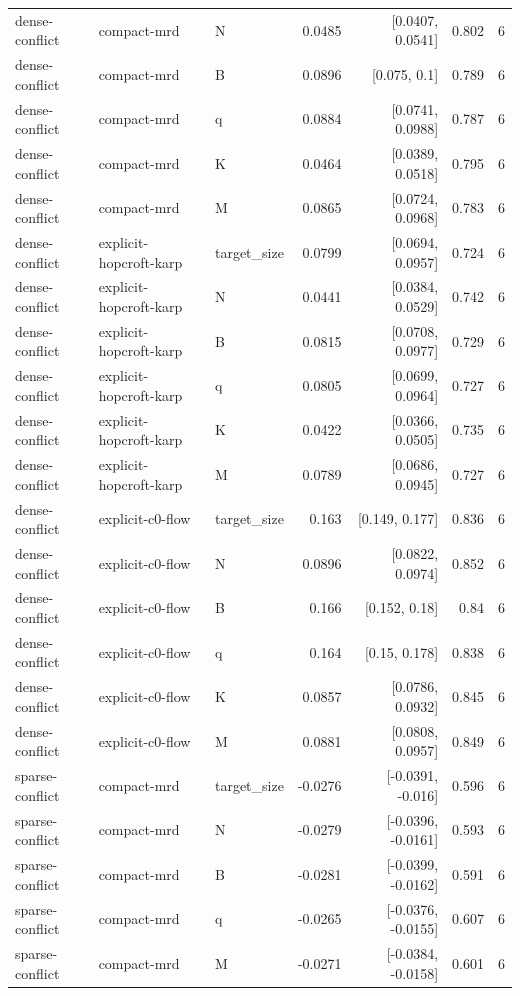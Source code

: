 \begin{table}[t]
\begin{tabular}{lllrrrr}
dense-conflict & compact-mrd & N & 0.0485 & [0.0407, 0.0541] & 0.802 & 6 \\
dense-conflict & compact-mrd & B & 0.0896 & [0.075, 0.1] & 0.789 & 6 \\
dense-conflict & compact-mrd & q & 0.0884 & [0.0741, 0.0988] & 0.787 & 6 \\
dense-conflict & compact-mrd & K & 0.0464 & [0.0389, 0.0518] & 0.795 & 6 \\
dense-conflict & compact-mrd & M & 0.0865 & [0.0724, 0.0968] & 0.783 & 6 \\
dense-conflict & explicit-hopcroft-karp & target_size & 0.0799 & [0.0694, 0.0957] & 0.724 & 6 \\
dense-conflict & explicit-hopcroft-karp & N & 0.0441 & [0.0384, 0.0529] & 0.742 & 6 \\
dense-conflict & explicit-hopcroft-karp & B & 0.0815 & [0.0708, 0.0977] & 0.729 & 6 \\
dense-conflict & explicit-hopcroft-karp & q & 0.0805 & [0.0699, 0.0964] & 0.727 & 6 \\
dense-conflict & explicit-hopcroft-karp & K & 0.0422 & [0.0366, 0.0505] & 0.735 & 6 \\
dense-conflict & explicit-hopcroft-karp & M & 0.0789 & [0.0686, 0.0945] & 0.727 & 6 \\
dense-conflict & explicit-c0-flow & target_size & 0.163 & [0.149, 0.177] & 0.836 & 6 \\
dense-conflict & explicit-c0-flow & N & 0.0896 & [0.0822, 0.0974] & 0.852 & 6 \\
dense-conflict & explicit-c0-flow & B & 0.166 & [0.152, 0.18] & 0.84 & 6 \\
dense-conflict & explicit-c0-flow & q & 0.164 & [0.15, 0.178] & 0.838 & 6 \\
dense-conflict & explicit-c0-flow & K & 0.0857 & [0.0786, 0.0932] & 0.845 & 6 \\
dense-conflict & explicit-c0-flow & M & 0.0881 & [0.0808, 0.0957] & 0.849 & 6 \\
sparse-conflict & compact-mrd & target_size & -0.0276 & [-0.0391, -0.016] & 0.596 & 6 \\
sparse-conflict & compact-mrd & N & -0.0279 & [-0.0396, -0.0161] & 0.593 & 6 \\
sparse-conflict & compact-mrd & B & -0.0281 & [-0.0399, -0.0162] & 0.591 & 6 \\
sparse-conflict & compact-mrd & q & -0.0265 & [-0.0376, -0.0155] & 0.607 & 6 \\
sparse-conflict & compact-mrd & M & -0.0271 & [-0.0384, -0.0158] & 0.601 & 6 \\

\end{tabular}
\end{table}
